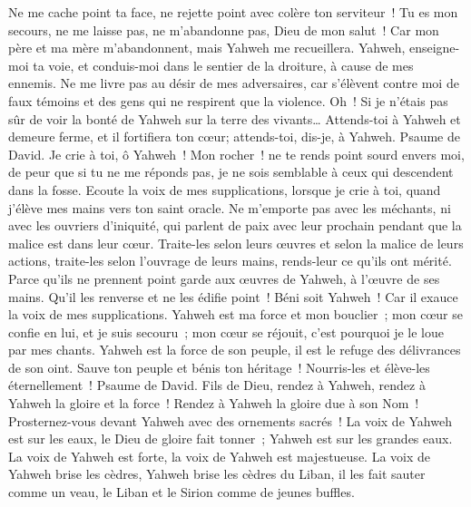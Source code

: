 \begin{multicols}{2}
Ne me cache point ta face, ne rejette point avec colère ton serviteur~! Tu es mon secours, ne me laisse pas, ne m'abandonne pas, Dieu de mon salut~!
Car mon père et ma mère m'abandonnent, mais Yahweh me recueillera.
Yahweh, enseigne-moi ta voie, et conduis-moi dans le sentier de la droiture, à cause de mes ennemis.
Ne me livre pas au désir de mes adversaires, car s'élèvent contre moi de faux témoins et des gens qui ne respirent que la violence.
Oh~! Si je n'étais pas sûr de voir la bonté de Yahweh sur la terre des vivants…
Attends-toi à Yahweh et demeure ferme, et il fortifiera ton cœur; attends-toi, dis-je, à Yahweh. 
\VerseOne{}Psaume de David. Je crie à toi, ô Yahweh~! Mon rocher~! ne te rends point sourd envers moi, de peur que si tu ne me réponds pas, je ne sois semblable à ceux qui descendent dans la fosse.
Ecoute la voix de mes supplications, lorsque je crie à toi, quand j'élève mes mains vers ton saint oracle.
Ne m'emporte pas avec les méchants, ni avec les ouvriers d'iniquité, qui parlent de paix avec leur prochain pendant que la malice est dans leur cœur.
Traite-les selon leurs œuvres et selon la malice de leurs actions, traite-les selon l'ouvrage de leurs mains, rends-leur ce qu'ils ont mérité.
Parce qu'ils ne prennent point garde aux œuvres de Yahweh, à l'œuvre de ses mains. Qu'il les renverse et ne les édifie point~!
Béni soit Yahweh~! Car il exauce la voix de mes supplications.
Yahweh est ma force et mon bouclier~; mon cœur se confie en lui, et je suis secouru~; mon cœur se réjouit, c'est pourquoi je le loue par mes chants.
Yahweh est la force de son peuple, il est le refuge des délivrances de son oint.
Sauve ton peuple et bénis ton héritage~! Nourris-les et élève-les éternellement~!
\VerseOne{}Psaume de David. Fils de Dieu, rendez à Yahweh, rendez à Yahweh la gloire et la force~!
Rendez à Yahweh la gloire due à son Nom~! Prosternez-vous devant Yahweh avec des ornements sacrés~!
La voix de Yahweh est sur les eaux, le Dieu de gloire fait tonner~; Yahweh est sur les grandes eaux.
La voix de Yahweh est forte, la voix de Yahweh est majestueuse.
La voix de Yahweh brise les cèdres, Yahweh brise les cèdres du Liban,
il les fait sauter comme un veau, le Liban et le Sirion comme de jeunes buffles.

\end{multicols}
